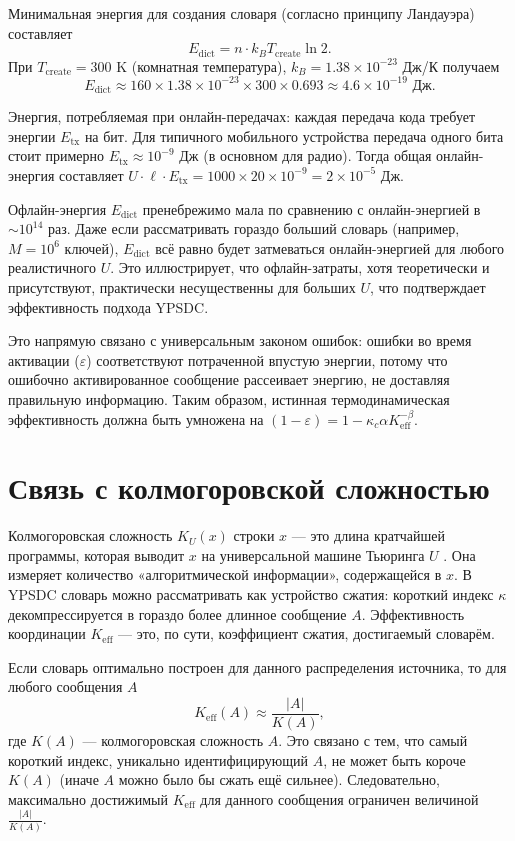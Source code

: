 \documentclass[12pt,a4paper]{article}
\theoremstyle{remark}
\newcommand{\Keff}{K_{\mathrm{eff}}}
\begin{document}
	Минимальная энергия для создания словаря (согласно принципу Ландауэра) составляет
	\[
	E_{\text{dict}} = n \cdot k_B T_{\text{create}} \ln 2.
	\]
	При $T_{\text{create}} = 300$ K (комнатная температура), $k_B = 1.38 \times 10^{-23}$ Дж/К получаем
	\[
	E_{\text{dict}} \approx 160 \times 1.38 \times 10^{-23} \times 300 \times 0.693 \approx 4.6 \times 10^{-19} \text{ Дж}.
	\]
	
	Энергия, потребляемая при онлайн-передачах: каждая передача кода требует энергии $E_{\text{tx}}$ на бит. Для типичного мобильного устройства передача одного бита стоит примерно $E_{\text{tx}} \approx 10^{-9}$ Дж (в основном для радио). Тогда общая онлайн-энергия составляет $U \cdot \ell \cdot E_{\text{tx}} = 1000 \times 20 \times 10^{-9} = 2 \times 10^{-5}$ Дж.
	
	Офлайн-энергия $E_{\text{dict}}$ пренебрежимо мала по сравнению с онлайн-энергией в $\sim 10^{14}$ раз. Даже если рассматривать гораздо больший словарь (например, $M = 10^6$ ключей), $E_{\text{dict}}$ всё равно будет затмеваться онлайн-энергией для любого реалистичного $U$. Это иллюстрирует, что офлайн-затраты, хотя теоретически и присутствуют, практически несущественны для больших $U$, что подтверждает эффективность подхода YPSDC.
	
	Это напрямую связано с универсальным законом ошибок: ошибки во время активации ($\varepsilon$) соответствуют потраченной впустую энергии, потому что ошибочно активированное сообщение рассеивает энергию, не доставляя правильную информацию. Таким образом, истинная термодинамическая эффективность должна быть умножена на $(1-\varepsilon) = 1 - \kappa_c\alpha K_{\mathrm{eff}}^{-\beta}$.
	
	\section{Связь с колмогоровской сложностью}
	\label{sec:kolmogorov}
	
	Колмогоровская сложность $K_U(x)$ строки $x$ — это длина кратчайшей программы, которая выводит $x$ на универсальной машине Тьюринга $U$ \cite{Kolmogorov1965}. Она измеряет количество «алгоритмической информации», содержащейся в $x$. В YPSDC словарь можно рассматривать как устройство сжатия: короткий индекс $\kappa$ декомпрессируется в гораздо более длинное сообщение $A$. Эффективность координации $\Keff$ — это, по сути, коэффициент сжатия, достигаемый словарём.
	
	Если словарь оптимально построен для данного распределения источника, то для любого сообщения $A$
	\begin{equation}
		\Keff(A) \approx \frac{|A|}{K(A)}, \label{eq:kolmogorov}
	\end{equation}
	где $K(A)$ — колмогоровская сложность $A$. Это связано с тем, что самый короткий индекс, уникально идентифицирующий $A$, не может быть короче $K(A)$ (иначе $A$ можно было бы сжать ещё сильнее). Следовательно, максимально достижимый $\Keff$ для данного сообщения ограничен величиной $\frac{|A|}{K(A)}$.
	
\end{document}
